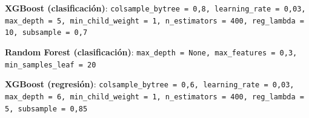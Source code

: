 \item \textbf{XGBoost (clasificación)}: \texttt{colsample\_bytree = 0{,}8, learning\_rate = 0{,}03, max\_depth = 5, min\_child\_weight = 1, n\_estimators = 400, reg\_lambda = 10, subsample = 0{,}7}
\item \textbf{Random Forest (clasificación)}: \texttt{max\_depth = None, max\_features = 0{,}3, min\_samples\_leaf = 20}
\item \textbf{XGBoost (regresión)}: \texttt{colsample\_bytree = 0{,}6, learning\_rate = 0{,}03, max\_depth = 6, min\_child\_weight = 1, n\_estimators = 400, reg\_lambda = 5, subsample = 0{,}85}

